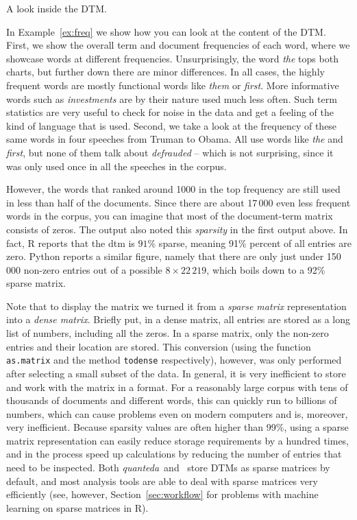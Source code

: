 \begin{ccsexample}
  \caption{A look inside the DTM.}\label{ex:freq}
\end{ccsexample}


In Example~\ref{ex:freq} we show how you can look at the content of the DTM. First, we show the overall term and document frequencies of each word, where we showcase words at different frequencies. Unsurprisingly, the word \emph{the} tops both charts, but further down there are minor differences.
In all cases, the highly frequent words are mostly functional words like \emph{them} or \emph{first}. More informative words such as \emph{investments} are by their nature used much less often.
Such term statistics are very useful to check for noise in the data and get a feeling of the kind of language that is used.
Second, we take a look at the frequency of these same words in four speeches from Truman to Obama. All use words like \emph{the} and \emph{first}, but none of them talk about \emph{defrauded} -- which is not surprising, since it was only used once in all the speeches in the corpus.

However, the words that ranked around 1000 in the top frequency are still used in less than half of the documents.
Since there are about 17\,000 even less frequent words in the corpus, you can imagine that most of the document-term matrix consists of zeros.
The output also noted this \emph{sparsity} in the first output above.
In fact, R reports that the dtm is $91\%$ sparse, meaning 91\% percent of all entries are zero.
Python reports a similar figure, namely that there are only just under 150\,000 non-zero entries
out of a possible $8\times22\,219$, which boils down to a 92\% sparse matrix.

Note that to display the matrix we turned it from a \emph{sparse matrix} representation into a \emph{dense matrix}.
Briefly put, in a dense matrix, all entries are stored as a long list of numbers, including all the zeros.
In a sparse matrix,  only the non-zero entries and their location are stored.
This conversion (using the function \verb|as.matrix| and the method \verb|todense| respectively), however, was only performed after selecting a small subset of the data.
In general,  it is very inefficient to store and work with the matrix in a  format.
For a reasonably large corpus with tens of thousands of documents and different words, this can quickly run to billions of numbers,
which can cause problems even on modern computers and is, moreover, very inefficient.
Because sparsity values are often higher than 99\%, using a sparse matrix representation can easily reduce storage requirements by a hundred times, and in the process speed up calculations by reducing the number of entries that need to be inspected.
Both \emph{quanteda}\ and \sklearn\ store DTMs as sparse matrices by default,
and most analysis tools are able to deal with sparse matrices very efficiently
(see, however, Section~\ref{sec:workflow} for problems with machine learning on sparse matrices in R).

